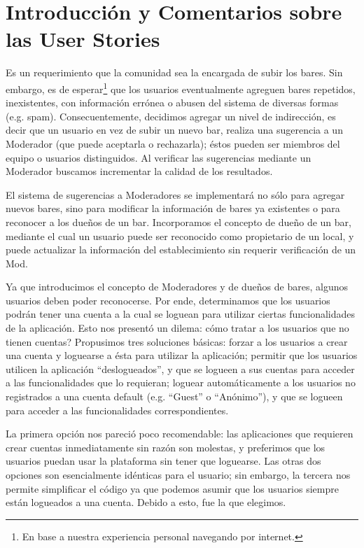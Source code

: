\documentclass[hidelinks,a4paper,11pt, nofootinbib]{article}
\begin{document}
\maketitle

\section{Introducción y Comentarios sobre las User Stories}

\par Es un requerimiento que la comunidad sea la encargada de subir los bares. 
Sin embargo, es de esperar\footnote{En base a nuestra experiencia personal navegando por internet.} que los usuarios eventualmente agreguen bares repetidos, inexistentes, con información errónea o abusen del sistema de diversas formas (e.g. spam).
Consecuentemente, decidimos agregar un nivel de indirección, es decir que un usuario en vez de subir un nuevo bar, realiza una sugerencia a un Moderador (que puede aceptarla o rechazarla); éstos pueden ser miembros del equipo o usuarios distinguidos. 
Al verificar las sugerencias mediante un Moderador buscamos incrementar la calidad de los resultados.

\par El sistema de sugerencias a Moderadores se implementará no sólo para agregar nuevos bares, sino para modificar la información de bares ya existentes o para reconocer a los dueños de un bar.
Incorporamos el concepto de dueño de un bar, mediante el cual un usuario puede ser reconocido como propietario de un local, y puede actualizar la información del establecimiento sin requerir verificación de un Mod.

\par Ya que introducimos el concepto de Moderadores y de dueños de bares, algunos usuarios deben poder reconocerse.
Por ende, determinamos que los usuarios podrán tener una cuenta a la cual se loguean para utilizar ciertas funcionalidades de la aplicación.
Esto nos presentó un dilema: cómo tratar a los usuarios que no tienen cuentas?
Propusimos tres soluciones básicas: forzar a los usuarios a crear una cuenta y loguearse a ésta para utilizar la aplicación; permitir que los usuarios utilicen la aplicación ``deslogueados'', y que se logueen a sus cuentas para acceder a las funcionalidades que lo requieran; loguear automáticamente a los usuarios no registrados a una cuenta default (e.g. ``Guest'' o ``Anónimo''), y que se logueen para acceder a las funcionalidades correspondientes.

\par La primera opción nos pareció poco recomendable: las aplicaciones que requieren crear cuentas inmediatamente sin razón son molestas, y preferimos que los usuarios puedan usar la plataforma sin tener que loguearse.
Las otras dos opciones son esencialmente idénticas para el usuario; sin embargo, la tercera nos permite simplificar el código ya que podemos asumir que los usuarios siempre están logueados a una cuenta. 
Debido a esto, fue la que elegimos.
\end{document}
